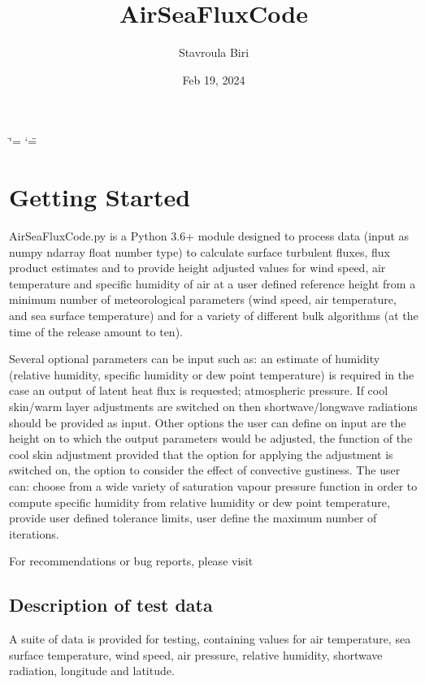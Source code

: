 \documentclass[letterpaper,10pt,english]{sphinxmanual}
\title{AirSeaFluxCode}
\date{Feb 19, 2024}
\author{Stavroula Biri}
\begin{document}
\ifdefined\shorthandoff
  \ifnum\catcode`\=\string=\active\shorthandoff{=}\fi
  \ifnum\catcode`\"=\active{}\fi
\fi

\pagestyle{empty}
\sphinxmaketitle
\pagestyle{plain}
\sphinxtableofcontents
\pagestyle{normal}
\label{\detokenize{index::doc}}


\sphinxstepscope


\chapter{Getting Started}
\label{\detokenize{getting_started:getting-started}}\label{\detokenize{getting_started::doc}}
\sphinxAtStartPar
AirSeaFluxCode.py is a Python 3.6+ module designed to process data (input as numpy ndarray float number type) to calculate surface turbulent fluxes, flux product estimates and to provide height adjusted values for wind speed, air temperature and specific humidity of air at a user defined reference height from a minimum number of meteorological parameters (wind speed, air temperature, and sea surface temperature) and for a variety of different bulk algorithms (at the time of the release amount to ten).

\sphinxAtStartPar
Several optional parameters can be input such as: an estimate of humidity (relative humidity, specific humidity or dew point temperature) is required in the case an output of latent heat flux is requested; atmospheric pressure. If cool skin/warm layer adjustments are switched on then shortwave/longwave radiations should be provided as input. Other options the user can define on input are the height on to which the output parameters would be adjusted, the function of the cool skin adjustment provided that the option for applying the adjustment is switched on, the option to consider the effect of convective gustiness. The user can: choose from a wide variety of saturation vapour pressure function in order to compute specific humidity from relative humidity or dew point temperature, provide user defined tolerance limits, user define the maximum number of iterations.

\sphinxAtStartPar
For recommendations or bug reports, please visit 


\section{Description of test data}
\label{\detokenize{getting_started:description-of-test-data}}
\sphinxAtStartPar
A suite of data is provided for testing, containing values for air temperature, sea surface temperature, wind speed, air pressure, relative humidity, shortwave radiation, longitude and latitude.
\end{document}
